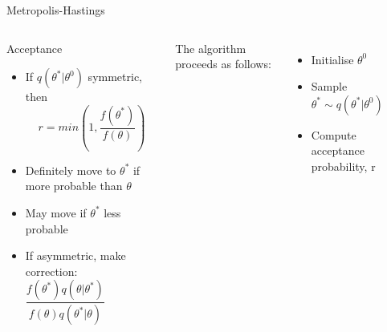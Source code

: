 \documentclass[compress]{beamer}
\begin{document}
\begin{frame}[label=sec-7-8]{Metropolis-Hastings}
\begin{columns}[c] 
\begin{block}{Acceptance}
\begin{itemize}
\item If $q(\theta^*|\theta^{0})$ symmetric, then 
$$ r = min(1,\dfrac{f(\theta^*)}{f(\theta)})$$
\item Definitely move to $\theta^*$ if more probable than $\theta$ 
\item May move if $\theta^*$ less probable 
\item If asymmetric, make correction: $\dfrac{f(\theta^*)q(\theta|\theta^*)}{f(\theta)q(\theta^*|\theta)}$
\end{itemize}
\end{block}

The algorithm proceeds as follows:\\
\begin{itemize}
\item Initialise $\theta^{0}$
\item Sample $\theta^* \sim q(\theta^*|\theta^{0})$
\item Compute acceptance probability, r
\end{itemize}
\end{columns}
\end{frame}
\end{document}
